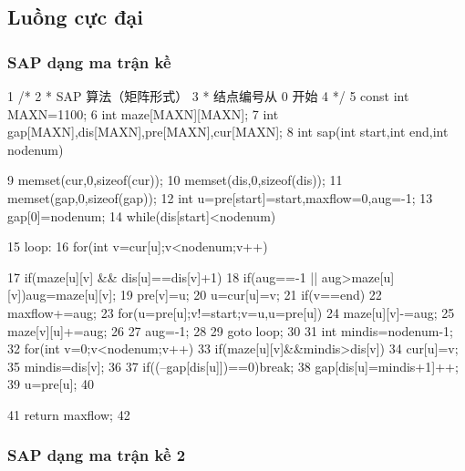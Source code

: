 \documentclass[11pt]{article}
\begin{document}
\subsection{Luồng cực đại}

\subsubsection{SAP dạng ma trận kề}

\begin{Code}
 1   /*
 2    * SAP 算法（矩阵形式）
 3    * 结点编号从 0 开始
 4    */
 5   const int MAXN=1100;
 6   int maze[MAXN][MAXN];
 7   int gap[MAXN],dis[MAXN],pre[MAXN],cur[MAXN];
 8   int sap(int start,int end,int nodenum){
 9       memset(cur,0,sizeof(cur));
10       memset(dis,0,sizeof(dis));
11       memset(gap,0,sizeof(gap));
12       int u=pre[start]=start,maxflow=0,aug=-1;
13       gap[0]=nodenum;
14       while(dis[start]<nodenum){
15           loop:
16             for(int v=cur[u];v<nodenum;v++)


17               if(maze[u][v] && dis[u]==dis[v]+1){
18                   if(aug==-1 || aug>maze[u][v])aug=maze[u][v];
19                   pre[v]=u;
20                   u=cur[u]=v;
21                   if(v==end){
22                       maxflow+=aug;
23                       for(u=pre[u];v!=start;v=u,u=pre[u]){
24                           maze[u][v]-=aug;
25                           maze[v][u]+=aug;
26                       }
27                       aug=-1;
28                   }
29                   goto loop;
30               }
31               int mindis=nodenum-1;
32               for(int v=0;v<nodenum;v++)
33                  if(maze[u][v]&&mindis>dis[v]){
34                      cur[u]=v;
35                      mindis=dis[v];
36                  }
37               if((--gap[dis[u]])==0)break;
38               gap[dis[u]=mindis+1]++;
39               u=pre[u];
40       }
41       return maxflow;
42 }
\end{Code}

\subsubsection{SAP dạng ma trận kề 2}
\end{document}

